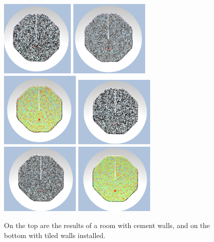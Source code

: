 \documentclass{thesis}
\begin{document}
\begin{figure}
        \centering
        \includegraphics[width=1.4in]{images/freq_cem}
        \includegraphics[width=1.5in]{images/intensity_cem}
        \includegraphics[width=1.5in]{images/hybridVis_cem}
        \includegraphics[width=1.5in]{images/freq_tile}
        \includegraphics[width=1.5in]{images/intensity_tile}
        \includegraphics[width=1.5in]{images/hybridVis_tile}
        \caption{On the top are the results of a room with cement walls, and on the bottom with tiled walls installed.}
    \end{figure}
\end{document}
